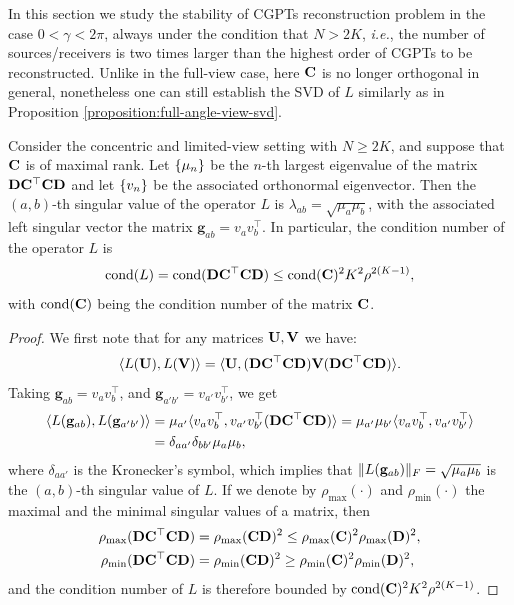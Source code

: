In this section we study the stability of CGPTs reconstruction
problem in the case $0<\gamma<2\pi$, always under the
condition that $N>2K$, {\it i.e.}, the number of sources/receivers
is two times larger than the highest order of CGPTs to be
reconstructed. Unlike in the full-view case, here $\mathbf{C}$ is no
longer orthogonal in general, nonetheless one can still establish
the SVD of $L$ similarly as in Proposition
\ref{proposition:full-angle-view-svd}.
\begin{proposition}
  Consider the concentric and limited-view setting with $N\geq 2K$, and suppose that $\mathbf{C}$ is
  of maximal rank. Let $\{ \mu_n \}$ be the $n$-th largest eigenvalue of the matrix $\mathbf{D} \mathbf{C}^\top \mathbf{C} \mathbf{D}$ and
  let $\{ v_n \}$ be the associated orthonormal eigenvector.
  Then the $(a,b)$-th singular
  value of the operator $L$ is $\lambda_{ab}=\sqrt{\mu_a\mu_b}$, with the associated left singular
  vector the matrix $\mathbf{g}_{ab}=v_a v_b^\top$. In particular, the condition
  number of the operator $L$ is
  \begin{equation}
    \label{eq:cond_L_lim_aov}
    \operatorname{cond}(L) = \operatorname{cond}(\mathbf{D}\mathbf{C}^\top\mathbf{C}\mathbf{D}) \leq \operatorname{cond}(\mathbf{C})^2
    K^2\rho^{2(K-1)},
  \end{equation}
with $\operatorname{cond}(\mathbf{C})$ being the condition number of the matrix $\mathbf{C}$.
\end{proposition}
\begin{proof}
  We first note that for any matrices $\mathbf{U}, \mathbf{V}$ we have:
  \begin{align*}
    \langle L(\mathbf{U}), L(\mathbf{V}) \rangle = \langle \mathbf{U}, (\mathbf{D}\mathbf{C}^\top\mathbf{C}\mathbf{D}) \mathbf{V}
    (\mathbf{D}\mathbf{C}^\top\mathbf{C}\mathbf{D}) \rangle.
  \end{align*}
   Taking $\mathbf{g}_{ab}=v_av_b^\top$, and
  $\mathbf{g}_{a'b'}=v_{a'}v_{b'}^\top$, we get
  \begin{align*}
    \langle L(\mathbf{g}_{ab}), L(\mathbf{g}_{a'b'}) \rangle &= \mu_{a'}\langle v_av_b^\top, v_{a'}v_{b'}^\top(\mathbf{D}
      \mathbf{C}^\top\mathbf{C}\mathbf{D}) \rangle = \mu_{a'}\mu_{b'}\langle v_av_b^\top,
      v_{a'}v_{b'}^\top \rangle \\
    &= \delta_{aa'}\delta_{bb'}\mu_a\mu_b,
  \end{align*}
 where $\delta_{aa'}$ is the Kronecker's symbol, which implies that $\mathopen\| L(\mathbf{g}_{ab}) \mathclose\|_F
 = \sqrt{\mu_a\mu_b}$ is the $(a,b)$-th singular value of
  $L$. If we denote by $\rho_{\text{max}}(\cdot)$ and $\rho_{\text{min}}(\cdot)$ the maximal and the minimal
  singular values of a matrix, then
  \begin{align*}
    \rho_{\text{max}}(\mathbf{D} \mathbf{C}^\top \mathbf{C} \mathbf{D}) &= \rho_{\text{max}}(\mathbf{C} \mathbf{D})^2
    \leq\rho_{\text{max}}(\mathbf{C})^2 \rho_{\text{max}}(\mathbf{D})^2,\\
    \rho_{\text{min}}(\mathbf{D} \mathbf{C}^\top \mathbf{C} \mathbf{D}) &= \rho_{\text{min}}(\mathbf{C}
     \mathbf{D})^2 \geq\rho_{\text{min}}(\mathbf{C})^2 \rho_{\text{min}}(\mathbf{D})^2,
  \end{align*}
  and the condition number of $L$ is therefore bounded by $\operatorname{cond}(\mathbf{C})^2 K^2\rho^{2(K-1)}$.
\end{proof}

